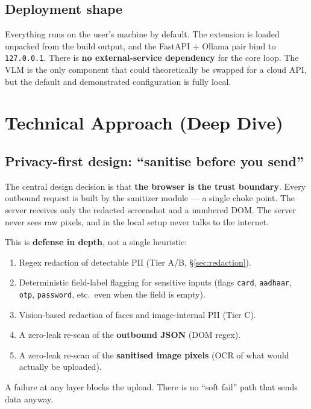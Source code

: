 \documentclass[11pt,a4paper]{article}
\newcommand{\code}[1]{\texttt{#1}}
\begin{document}
\subsection*{Deployment shape}
Everything runs on the user's machine by default. The extension is loaded unpacked from the build output, and the FastAPI + Ollama pair bind to \code{127.0.0.1}. There is \textbf{no external-service dependency} for the core loop. The VLM is the only component that could theoretically be swapped for a cloud API, but the default and demonstrated configuration is fully local.

\section{Technical Approach (Deep Dive)}

\subsection{Privacy-first design: ``sanitise before you send''}
The central design decision is that \textbf{the browser is the trust boundary}. Every outbound request is built by the sanitizer module --- a single choke point. The server receives only the redacted screenshot and a numbered DOM. The server never sees raw pixels, and in the local setup never talks to the internet.

This is \textbf{defense in depth}, not a single heuristic:
\begin{enumerate}
  \item Regex redaction of detectable PII (Tier A/B, \S\ref{sec:redaction}).
  \item Deterministic field-label flagging for sensitive inputs (flags \code{card}, \code{aadhaar}, \code{otp}, \code{password}, etc.\ even when the field is empty).
  \item Vision-based redaction of faces and image-internal PII (Tier C).
  \item A zero-leak re-scan of the \textbf{outbound JSON} (DOM regex).
  \item A zero-leak re-scan of the \textbf{sanitised image pixels} (OCR of what would actually be uploaded).
\end{enumerate}
A failure at any layer blocks the upload. There is no ``soft fail'' path that sends data anyway.
\end{document}
